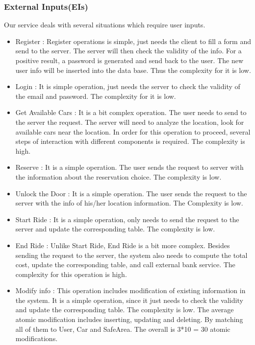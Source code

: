 \documentclass{article}
\begin{document}
	\subsubsection{External Inputs(EIs)}
	Our service deals with several situations which require user inputs. 
	\begin{itemize}
		\item Register : Register operations is simple, just needs the client to fill a form and send to the server. The server will then check the validity of the info. For a positive result, a password is generated and send back to the user. The new user info will be inserted into the data base. Thus the complexity for it is low.
		\item Login : It is simple operation, just needs the server to check the validity of the email and password. The complexity for it is low.
		\item Get Available Cars : It is a bit complex operation. The user needs to send to the server the request. The server will need to analyze the location, look for available cars near the location. In order for this operation to proceed, several steps of interaction with different components is required. The complexity is high.
		\item Reserve : It is a simple operation. The user sends the request to server with the information about the reservation choice. The complexity is low.
		\item Unlock the Door : It is a simple operation. The user sends the request to the server with the info of his/her location information. The Complexity is low.
		\item Start Ride : It is a simple operation, only needs to send the request to the server and update the corresponding table. The complexity is low.
		\item End Ride : Unlike Start Ride, End Ride is a bit more complex. Besides sending the request to the server, the system also needs to compute the total cost, update the corresponding table, and call external bank service. The complexity for this operation is high.
		\item Modify info : This operation includes modification of existing information in the system. It is a simple operation, since it just needs to check the validity and update the corresponding table. The complexity is low. The average atomic modification includes inserting, updating and deleting. By matching all of them to User, Car and SafeArea. The overall is 3*10 = 30 atomic modifications.
		\begin{table}[h]

\end{table}
\end{itemize}
\end{document}

